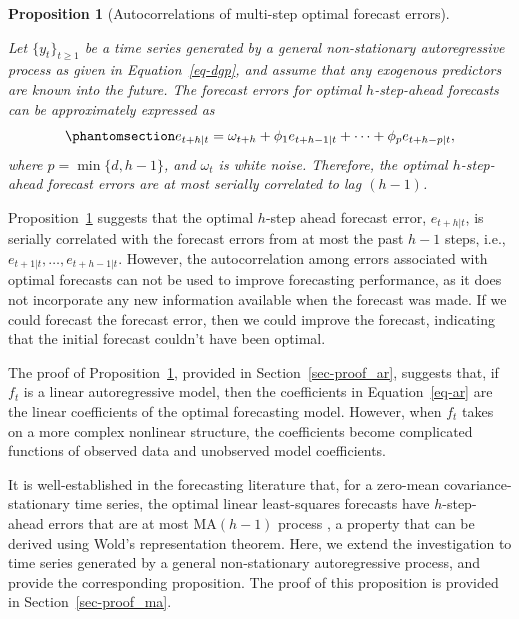 \documentclass[
  11pt,
  a4paper,
]{article}
\theoremstyle{plain}
\newtheorem{proposition}{Proposition}[section]
\theoremstyle{remark}
\begin{document}
\begin{proposition}[Autocorrelations of multi-step optimal forecast
errors]\protect\hypertarget{prp-ar}{}\label{prp-ar}

Let \(\{y_t\}_{t \geq 1}\) be a time series generated by a general
non-stationary autoregressive process as given in Equation~\ref{eq-dgp},
and assume that any exogenous predictors are known into the future. The
forecast errors for optimal \(h\)-step-ahead forecasts can be
approximately expressed as \begin{equation}\phantomsection\label{eq-ar}{
e_{t+h|t} = \omega_{t+h} + \phi_1e_{t+h-1|t} + \cdots + \phi_{p}e_{t+h-p|t},
}\end{equation} where \(p=\min\{d, h-1\}\), and \(\omega_{t}\) is white
noise. Therefore, the optimal \(h\)-step-ahead forecast errors are at
most serially correlated to lag \((h-1)\).

\end{proposition}

Proposition~\ref{prp-ar} suggests that the optimal \(h\)-step ahead
forecast error, \(e_{t+h|t}\), is serially correlated with the forecast
errors from at most the past \(h-1\) steps, i.e.,
\(e_{t+1|t}, \ldots, e_{t+h-1|t}\). However, the autocorrelation among
errors associated with optimal forecasts can not be used to improve
forecasting performance, as it does not incorporate any new information
available when the forecast was made. If we could forecast the forecast
error, then we could improve the forecast, indicating that the initial
forecast couldn't have been optimal.

The proof of Proposition~\ref{prp-ar}, provided in
Section~\ref{sec-proof_ar}, suggests that, if \(f_t\) is a linear
autoregressive model, then the coefficients in Equation~\ref{eq-ar} are
the linear coefficients of the optimal forecasting model. However, when
\(f_t\) takes on a more complex nonlinear structure, the coefficients
become complicated functions of observed data and unobserved model
coefficients.

It is well-established in the forecasting literature that, for a
zero-mean covariance-stationary time series, the optimal linear
least-squares forecasts have \(h\)-step-ahead errors that are at most
MA\((h-1)\) process \autocite{harvey1997,diebold2024}, a property that
can be derived using Wold's representation theorem. Here, we extend the
investigation to time series generated by a general non-stationary
autoregressive process, and provide the corresponding proposition. The
proof of this proposition is provided in Section~\ref{sec-proof_ma}.
\end{document}
